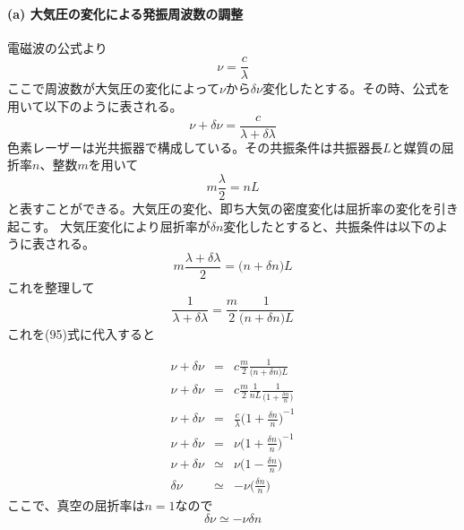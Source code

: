 \documentclass[11pt,a4paper]{jsarticle}
\begin{document}
\paragraph{(a) 大気圧の変化による発振周波数の調整\\}
電磁波の公式より
\begin{equation}
  \nu = \frac{c}{\lambda}
\end{equation}
ここで周波数が大気圧の変化によって$\nu$から$\delta \nu$変化したとする。その時、公式を用いて以下のように表される。
\begin{equation}
  \nu + \delta \nu = \frac{c}{\lambda + \delta \lambda}
\end{equation}
色素レーザーは光共振器で構成している。その共振条件は共振器長$L$と媒質の屈折率$n$、整数$m$を用いて
\begin{equation}
  m \frac{\lambda}{2} = n L
\end{equation}
と表すことができる。大気圧の変化、即ち大気の密度変化は屈折率の変化を引き起こす。
大気圧変化により屈折率が$\delta n$変化したとすると、共振条件は以下のように表される。
\begin{equation}
  m \frac{\lambda + \delta \lambda}{2} = \bigr(n + \delta n\bigl) L
\end{equation}
これを整理して
\begin{equation}
  \frac{1}{\lambda + \delta \lambda} = \frac{m}{2} \frac{1}{\bigr(n + \delta n\bigl) L}
\end{equation}
これを(95)式に代入すると

\begin{eqnarray}
  \nu + \delta \nu &=& c \frac{m}{2} \frac{1}{\bigr(n + \delta n\bigl) L}\\
  \nu + \delta \nu &=& c \frac{m}{2} \frac{1}{nL} \frac{1}{\bigr(1 + \frac{\delta n}{n}\bigl) }\\
  \nu + \delta \nu &=&  \frac{c}{\lambda} {\bigr(1 + \frac{\delta n}{n}\bigl)}^{-1}\\
  \nu + \delta \nu &=&  \nu {\bigr(1 + \frac{\delta n}{n}\bigl)}^{-1}\\
  \nu + \delta \nu &\simeq&   \nu \bigr(1 - \frac{\delta n}{n}\bigl)\\
  \delta \nu &\simeq& - \nu \bigr(\frac{\delta n}{n}\bigl)
\end{eqnarray}
ここで、真空の屈折率は$n=1$なので
\begin{equation}
  \delta \nu \simeq - \nu \delta n
\end{equation}
\end{document}
